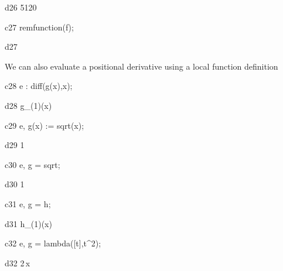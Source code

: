 \documentclass[12pt]{article}
\begin{document}
\begin{mdline}{d26}
   5120
\end{mdline}

\begin{mcline}{c27}
   remfunction(f);
\end{mcline}



\begin{mdline}{d27}
   \left[ f \right] 
\end{mdline}


\noindent We can also evaluate a positional derivative using a local 
function definition


\begin{mcline}{c28}
     e : diff(g(x),x);
\end{mcline}



\begin{mdline}{d28}
   g_{\left(1\right)}(x)
\end{mdline}

\begin{mcline}{c29}
   e, g(x) := sqrt(x);
\end{mcline}



\begin{mdline}{d29}
   {{1}}
\end{mdline}

\begin{mcline}{c30}
   e, g = sqrt;
\end{mcline}



\begin{mdline}{d30}
   {{1}}
\end{mdline}

\begin{mcline}{c31}
   e, g = h;
\end{mcline}



\begin{mdline}{d31}
   h_{\left(1\right)}(x)
\end{mdline}

\begin{mcline}{c32}
   e, g = lambda([t],t^2);
\end{mcline}



\begin{mdline}{d32}
   2\,x
\end{mdline}
\end{document}
